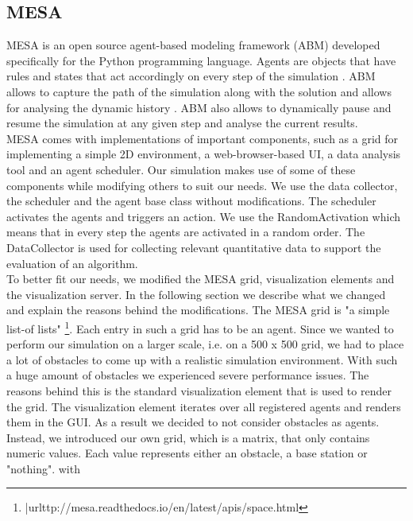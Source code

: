 \subsection{MESA}
MESA \cite{masad.2015} is an open source agent-based modeling framework (ABM) developed specifically for the Python programming language.  Agents are objects that have rules and states that act accordingly on every step of the simulation \cite{axtell.2000}. ABM allows to capture the path of the simulation along with the solution and allows for analysing the dynamic history \cite{axtell.2000}. ABM also allows to dynamically pause and resume the simulation at any given step and analyse the current results.\\
MESA comes with implementations of important components, such as a grid for implementing a simple 2D environment, a web-browser-based UI, a data analysis tool and an agent scheduler. Our simulation makes use of some of these components while modifying others to suit our needs. We use the data collector, the scheduler and the agent base class without modifications. The scheduler activates the agents and triggers an action. We use the RandomActivation which means that in every step the agents are activated in a random order. The DataCollector is used for collecting relevant quantitative data to support the evaluation of an algorithm.\\
To better fit our needs, we modified the MESA grid, visualization elements and the visualization server. In the following section we describe what we changed and explain the reasons behind the modifications.
The MESA grid is "a simple list-of lists" \footnote{|url{ttp://mesa.readthedocs.io/en/latest/apis/space.html}}. Each entry in such a grid has to be an agent. Since we wanted to perform our simulation on a larger scale, i.e. on a 500 x 500 grid, we had to place a lot of obstacles to come up with a realistic simulation environment. With such a huge amount of obstacles we experienced severe performance issues. The reasons behind this is the standard visualization element that is used to render the grid. The visualization element iterates over all registered agents and renders them in the GUI. As a result we decided to not consider obstacles as agents. Instead, we introduced our own grid, which is a matrix, that only contains numeric values. Each value represents either an obstacle, a base station or "nothing". 
with 
